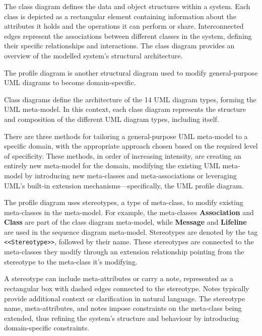 \documentclass{article}
\newcounter{subsubsubsection}[subsubsection]
\begin{document}
{

The class diagram defines the data and object structures within a system\cite{Seidl_Scholz_Huemer_Kappel_Duffy_2014}. Each class is depicted as a rectangular element containing information about the attributes it holds and the operations it can perform or share. Interconnected edges represent the associations between different classes in the system, defining their specific relationships and interactions. The class diagram provides an overview of the modelled system's structural architecture.


The profile diagram is another structural diagram used to modify general-purpose UML diagrams to become domain-specific.

Class diagrams define the architecture of the 14 UML diagram types, forming the UML meta-model. In this context, each class diagram represents the structure and composition of the different UML diagram types, including itself\cite{Seidl_Scholz_Huemer_Kappel_Duffy_2014}.

There are three methods for tailoring a general-purpose UML meta-model to a specific domain, with the appropriate approach chosen based on the required level of specificity. These methods, in order of increasing intensity, are creating an entirely new meta-model for the domain, modifying the existing UML meta-model by introducing new meta-classes and meta-associations or leveraging UML's built-in extension mechanisms—specifically, the UML profile diagram\cite{Seidl_Scholz_Huemer_Kappel_Duffy_2014}.

The profile diagram uses stereotypes, a type of meta-class, to modify existing meta-classes in the meta-model. For example, the meta-classes \textbf{Association} and \textbf{Class} are part of the class diagram meta-model, while \textbf{Message} and \textbf{Lifeline} are used in the sequence diagram meta-model. Stereotypes are denoted by the tag \texttt{<<Stereotype>>}, followed by their name. These stereotypes are connected to the meta-classes they modify through an extension relationship pointing from the stereotype to the meta-class it's modifying\cite{Seidl_Scholz_Huemer_Kappel_Duffy_2014}.

A stereotype can include meta-attributes or carry a note, represented as a rectangular box with dashed edges connected to the stereotype. Notes typically provide additional context or clarification in natural language. The stereotype name, meta-attributes, and notes impose constraints on the meta-class being extended, thus refining the system's structure and behaviour by introducing domain-specific constraints\cite{Seidl_Scholz_Huemer_Kappel_Duffy_2014}. 

}
\end{document}
